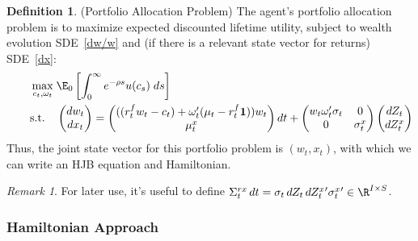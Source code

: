 \documentclass[12pt]{article}
\theoremstyle{plain}
\theoremstyle{definition}
\newtheorem{defn}[thm]{Definition}
\theoremstyle{remark}
\newtheorem*{rmk}{Remark}
\begin{document}
\begin{defn}(Portfolio Allocation Problem)
\label{portfolioproblem}
The agent's portfolio allocation problem is to maximize expected
discounted lifetime utility, subject to wealth evolution SDE~\ref{dw/w}
and (if there is a relevant state vector for returns) SDE~\ref{dx}:
\begin{align*}
  \max_{c_t,\omega_t}
  \;&
  \E_0\left[
    \int_0^\infty
    e^{-\rho s}
    u(c_s)
    \;ds
  \right]
  \notag
  \\
  \qquad\text{s.t.}\quad
  &
  \begin{pmatrix}
    dw_t \\ dx_t
  \end{pmatrix}
  =
  \begin{pmatrix}
    (
    (r_t^fw_t-c_t)
    +
    \omega_{t}'
    (\mu_t - r^f_t\mathbf{1})
    )w_t
    \\
    \mu_t^x
  \end{pmatrix}
  dt
  +
  \begin{pmatrix}
    w_t
    \omega_{t}'
    \sigma_t
    & 0
    \\
    0 & \sigma_t^x
  \end{pmatrix}
  \begin{pmatrix}
    dZ_t
    \\
    dZ_t^x
  \end{pmatrix}
\end{align*}
Thus, the joint state vector for this portfolio problem is $(w_t,x_t)$,
with which we can write an HJB equation and Hamiltonian.
\end{defn}
\begin{rmk}
For later use, it's useful to define
$\Sigma_t^{rx}\,dt=\sigma_t\,dZ_t\,dZ_t^x{}'\sigma_t^x{}'\in\R^{I\times S}$.
\end{rmk}


\clearpage
\subsubsection{Hamiltonian Approach}
\end{document}
